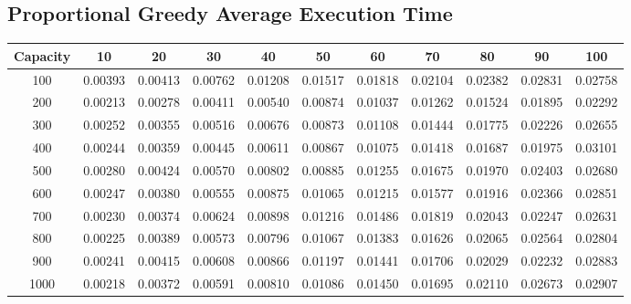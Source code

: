 \documentclass{article}
\begin{document}
\subsection{Proportional Greedy Average Execution Time}
\begin{center}
\begin{tabular}{ccccccccccc}
\toprule
Capacity & 10 & 20 & 30 & 40 & 50 & 60 & 70 & 80 & 90 & 100 \\
\midrule
100 & 0.00393 & 0.00413 & 0.00762 & 0.01208 & 0.01517 & 0.01818 & 0.02104 & 0.02382 & 0.02831 & 0.02758 \\
200 & 0.00213 & 0.00278 & 0.00411 & 0.00540 & 0.00874 & 0.01037 & 0.01262 & 0.01524 & 0.01895 & 0.02292 \\
300 & 0.00252 & 0.00355 & 0.00516 & 0.00676 & 0.00873 & 0.01108 & 0.01444 & 0.01775 & 0.02226 & 0.02655 \\
400 & 0.00244 & 0.00359 & 0.00445 & 0.00611 & 0.00867 & 0.01075 & 0.01418 & 0.01687 & 0.01975 & 0.03101 \\
500 & 0.00280 & 0.00424 & 0.00570 & 0.00802 & 0.00885 & 0.01255 & 0.01675 & 0.01970 & 0.02403 & 0.02680 \\
600 & 0.00247 & 0.00380 & 0.00555 & 0.00875 & 0.01065 & 0.01215 & 0.01577 & 0.01916 & 0.02366 & 0.02851 \\
700 & 0.00230 & 0.00374 & 0.00624 & 0.00898 & 0.01216 & 0.01486 & 0.01819 & 0.02043 & 0.02247 & 0.02631 \\
800 & 0.00225 & 0.00389 & 0.00573 & 0.00796 & 0.01067 & 0.01383 & 0.01626 & 0.02065 & 0.02564 & 0.02804 \\
900 & 0.00241 & 0.00415 & 0.00608 & 0.00866 & 0.01197 & 0.01441 & 0.01706 & 0.02029 & 0.02232 & 0.02883 \\
1000 & 0.00218 & 0.00372 & 0.00591 & 0.00810 & 0.01086 & 0.01450 & 0.01695 & 0.02110 & 0.02673 & 0.02907 \\
\bottomrule
\end{tabular}
\end{center}
\end{document}
